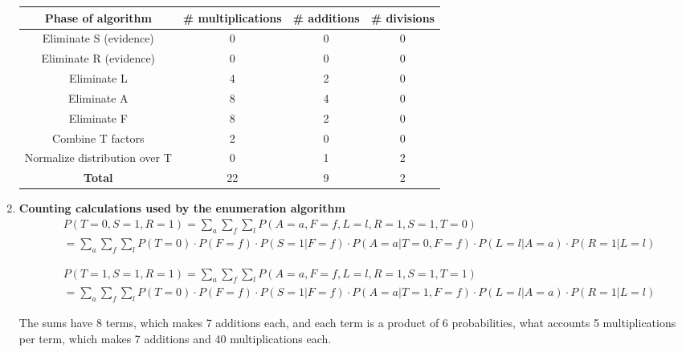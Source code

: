 \documentclass[11]{article}
\begin{document}
\begin{enumerate}[label=(\alph*)]
\begin{table}[htp]
\centering
\begin{tabular}{|c|c|c|c|}
\hline
\textbf{Phase of algorithm}   & \textbf{\# multiplications} & \textbf{\# additions} & \textbf{\# divisions} \\ \hline
Eliminate S (evidence)        & 0                           & 0                     & 0                     \\ \hline
Eliminate R (evidence)        & 0                           & 0                     & 0                     \\ \hline
Eliminate L                   & 4                           & 2                     & 0                     \\ \hline
Eliminate A                   & 8                           & 4                     & 0                     \\ \hline
Eliminate F                   & 8                           & 2                     & 0                     \\ \hline
Combine T factors             & 2                           & 0                     & 0                     \\ \hline
Normalize distribution over T & 0                           & 1                     & 2                     \\ \hline
\textbf{Total}                & 22                          & 9                     & 2                     \\ \hline
\end{tabular}
\end{table}
\pagebreak
\item{\textbf{Counting calculations used by the enumeration algorithm}}
\begin{align*}
& P(T=0,S=1,R=1) =\sum_a \sum_f \sum_l P(A=a,F=f,L=l,R=1,S=1,T=0)\\
&= \sum_a \sum_f \sum_l P(T=0) \cdot P(F=f) \cdot P(S=1|F=f) \cdot P(A=a|T=0,F=f) \cdot P(L=l|A=a) \cdot P(R=1|L=l)
\end{align*}

\begin{align*}
& P(T=1,S=1,R=1) =\sum_a \sum_f \sum_l P(A=a,F=f,L=l,R=1,S=1,T=1)\\
&= \sum_a \sum_f \sum_l P(T=0) \cdot P(F=f) \cdot P(S=1|F=f) \cdot P(A=a|T=1,F=f) \cdot P(L=l|A=a) \cdot P(R=1|L=l)
\end{align*}

The sums have 8 terms, which makes 7 additions each, and each term is a product of 6 probabilities, what accounts 5 multiplications per term, which makes 7 additions and 40 multiplications each.


\end{enumerate}
\end{document}
